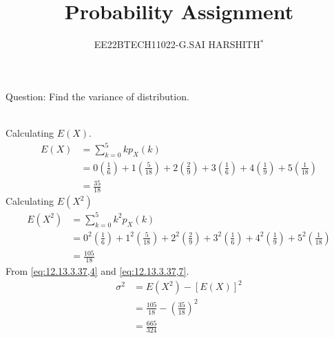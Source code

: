 \documentclass[journal,12pt,twocolumn]{IEEEtran}
\theoremstyle{remark}
\begin{document}

\vspace{3cm}

\title{Probability Assignment}
\author{EE22BTECH11022-G.SAI HARSHITH$^{*}$%
}
\maketitle
\newpage
\bigskip
\renewcommand{\thefigure}{\theenumi}
\renewcommand{\thetable}{\theenumi}

Question: Find the variance of distribution.
\begin{table}[!ht]
	
\end{table}\\
\fi
\solution
Calculating $E(X)$.
\begin{align}
E(X)&=\sum_{k=0}^{5} kp_X(k)\\
&=0\left(\frac{1}{6}\right)+1\left(\frac{5}{18}\right)+2\left(\frac{2}{9}\right)+3\left(\frac{1}{6}\right)+4\left(\frac{1}{9}\right)+5\left(\frac{1}{18}\right)\\
&=\frac{35}{18}
\label{eq:12.13.3.37,4}
\end{align}
Calculating $E(X^2)$
\begin{align}
E(X^2)&=\sum_{k=0}^{5} k^2p_X(k)\\
&=0^2\left(\frac{1}{6}\right)+1^2\left(\frac{5}{18}\right)+2^2\left(\frac{2}{9}\right)+3^2\left(\frac{1}{6}\right)+4^2\left(\frac{1}{9}\right)+5^2\left(\frac{1}{18}\right)\\
&=\frac{105}{18}
\label{eq:12.13.3.37,7}
\end{align}
From \eqref{eq:12.13.3.37,4} and \eqref{eq:12.13.3.37,7}.
\begin{align}
\sigma^2&=E(X^2)-[E(X)]^2\\
&=\frac{105}{18}-\left(\frac{35}{18}\right)^2\\
&=\frac{665}{324}
\end{align}
\end{document}
